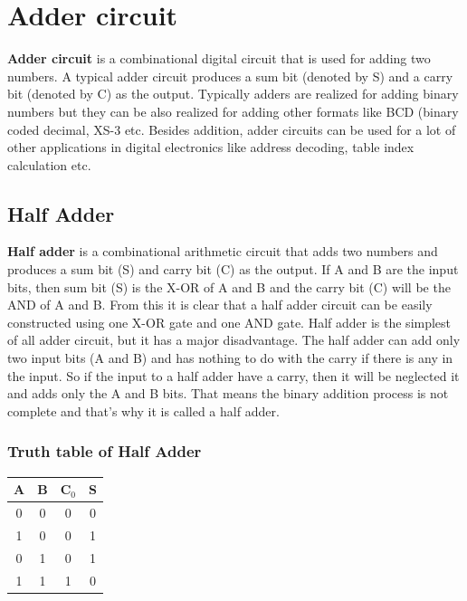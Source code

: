 \documentclass{report}
\begin{document}
\section{Adder circuit}
\textbf{Adder circuit} is a combinational digital circuit that is used for adding two numbers. A typical adder circuit produces a sum bit (denoted by S) and a carry bit (denoted by C) as the output. Typically adders are realized  for adding binary numbers but they can be also realized  for adding other formats like BCD (binary coded decimal, XS-3 etc. Besides addition, adder circuits can be used for a lot of other applications in digital electronics like address decoding, table index calculation etc.

\subsection{Half Adder}
\textbf{Half adder} is a combinational  arithmetic circuit that adds two numbers and produces a sum bit (S) and carry bit (C) as the output. If  A and B are the input bits, then sum bit (S) is the X-OR of A and B  and the carry bit (C) will be the AND of A and B. From this it is clear that a half adder circuit can be easily constructed using one X-OR gate and one AND gate. Half adder is the simplest of all adder circuit, but it has a major disadvantage.  The half adder can add only two input bits (A and B) and has nothing to do with the carry if there is any in the input. So if the input to a half adder have a carry, then it will be neglected it and adds only the A and B bits. That means the binary addition process is not complete and that’s why it is called a half adder.
\subsubsection{Truth table of Half Adder}
\begin{center}
\begin{tabular}{ |c|c|c c| } 
 \hline
 A & B & C$_0$ & S \\ \hline
 0 & 0 & 0 & 0 \\ 
 1 & 0 & 0 & 1 \\ 
 0 & 1 & 0 & 1 \\ 
 1 & 1 & 1 & 0 \\ 
 \hline
\end{tabular}
\end{center}
\end{document}
